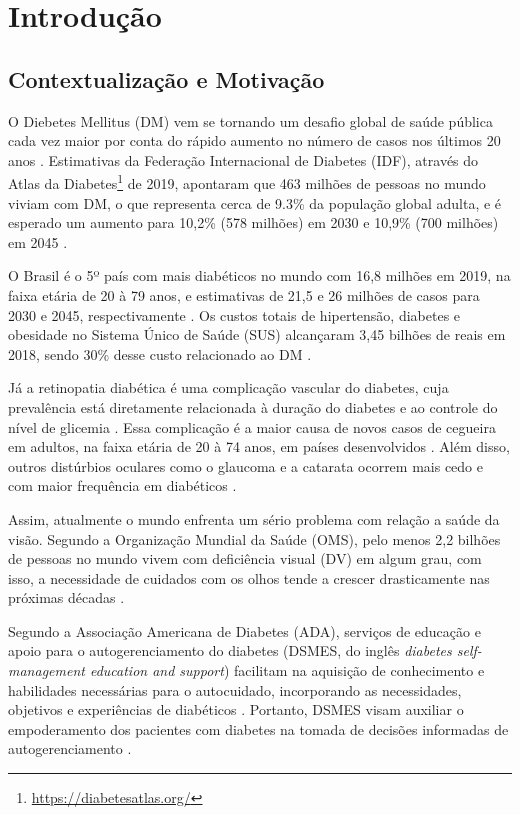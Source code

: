 \chapter{Introdução}

\section{Contextualização e Motivação}

O Diebetes Mellitus (DM) vem se tornando um desafio global de saúde pública cada vez maior por conta do rápido aumento no número de casos nos últimos
20 anos \cite{ADA2019}.
Estimativas da Federação Internacional de Diabetes (IDF), através do Atlas da Diabetes\footnote{\url{https://diabetesatlas.org/}}
de 2019, apontaram que 463 milhões de pessoas no mundo viviam com DM, o que representa cerca de 9.3\% da população
global adulta, e é esperado um aumento para 10,2\% (578 milhões) em 2030 e 10,9\% (700 milhões) em 2045 \cite{SAEEDI2019107843}.

O Brasil é o 5º país com mais diabéticos no mundo com 16,8 milhões em 2019, na faixa etária de 20 à 79 anos, e estimativas
de 21,5 e 26 milhões de casos para 2030 e 2045, respectivamente \cite{SAEEDI2019107843}. Os custos totais de hipertensão, diabetes
e obesidade no Sistema Único de Saúde (SUS) alcançaram 3,45 bilhões de reais em 2018, sendo 30\% desse custo relacionado ao DM \cite{Nilson2020}.

Já a retinopatia diabética é uma complicação vascular do diabetes, cuja prevalência está diretamente relacionada à duração
do diabetes e ao controle do nível de glicemia \cite{Solomon412}. Essa complicação é a maior causa de novos casos de cegueira
em adultos, na faixa etária de 20 à 74 anos, em países desenvolvidos \cite{ADA2019}. Além disso, outros distúrbios oculares
como o glaucoma e a catarata ocorrem mais cedo e com maior frequência em diabéticos \cite{ADA2019}.

Assim, atualmente o mundo enfrenta um sério problema com relação a saúde da visão. Segundo a Organização Mundial da Saúde (OMS),
pelo menos 2,2 bilhões de pessoas no mundo vivem com deficiência visual (DV) em algum grau, com isso,
a necessidade de cuidados com os olhos tende a crescer drasticamente nas próximas décadas \cite{WHO2019}.

Segundo a Associação Americana de Diabetes (ADA), serviços de educação e apoio para o autogerenciamento do diabetes
(DSMES, do inglês \emph{diabetes self-management education and support}) facilitam na aquisição de conhecimento e habilidades
necessárias para o autocuidado, incorporando as necessidades, objetivos e experiências de diabéticos \cite{ADA2019}. Portanto, DSMES
visam auxiliar o empoderamento dos pacientes com diabetes na tomada de decisões informadas de autogerenciamento \cite{Marrero2013}.

